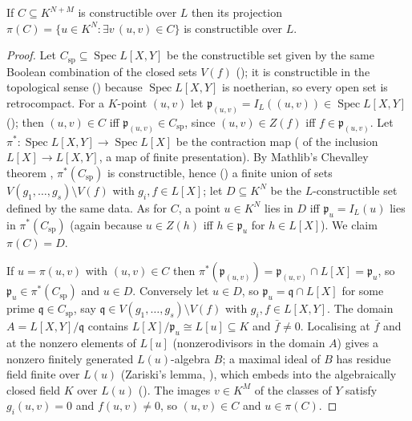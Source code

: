 \begin{theorem}\label{thm:chevalley}
If $C\subseteq K^{N+M}$ is constructible over $L$ then its projection
$\pi(C)=\{u\in K^N:\exists v\,(u,v)\in C\}$ is constructible over $L$.
\end{theorem}
\begin{proof}
Let $C_{\mathrm{sp}}\subseteq\operatorname{Spec}L[X,Y]$ be the constructible set given by
the same Boolean combination of the closed sets $V(f)$ ();
it is constructible in the topological sense () because
$\operatorname{Spec}L[X,Y]$ is noetherian, so every open set is retrocompact.
For a $K$-point $(u,v)$ let $\mathfrak p_{(u,v)}=I_L((u,v))\in\operatorname{Spec}L[X,Y]$
(); then $(u,v)\in C$ iff $\mathfrak p_{(u,v)}\in C_{\mathrm{sp}}$,
since $(u,v)\in Z(f)$ iff $f\in\mathfrak p_{(u,v)}$.  Let
$\pi^*:\operatorname{Spec}L[X,Y]\to\operatorname{Spec}L[X]$ be the contraction map
( of the inclusion $L[X]\to L[X,Y]$, a map of finite
presentation).  By Mathlib's Chevalley theorem
, $\pi^*(C_{\mathrm{sp}})$ is
constructible, hence () a finite
union of sets $V(g_1,\dots,g_s)\setminus V(f)$ with $g_i,f\in L[X]$; let $D\subseteq K^N$
be the $L$-constructible set defined by the same data.  As for $C$, a point $u\in K^N$
lies in $D$ iff $\mathfrak p_u=I_L(u)$ lies in $\pi^*(C_{\mathrm{sp}})$ (again because
$u\in Z(h)$ iff $h\in\mathfrak p_u$ for $h\in L[X]$).  We claim $\pi(C)=D$.

If $u=\pi(u,v)$ with $(u,v)\in C$ then $\pi^*(\mathfrak p_{(u,v)})=\mathfrak p_{(u,v)}\cap L[X]
=\mathfrak p_u$, so $\mathfrak p_u\in\pi^*(C_{\mathrm{sp}})$ and $u\in D$.  Conversely let
$u\in D$, so $\mathfrak p_u=\mathfrak q\cap L[X]$ for some prime $\mathfrak q\in C_{\mathrm{sp}}$,
say $\mathfrak q\in V(g_1,\dots,g_s)\setminus V(f)$ with $g_i,f\in L[X,Y]$.  The domain
$A=L[X,Y]/\mathfrak q$ contains $L[X]/\mathfrak p_u\cong L[u]\subseteq K$ and $\bar f\ne0$.
Localising at $\bar f$ and at the nonzero elements of $L[u]$ (nonzerodivisors in the
domain $A$) gives a nonzero finitely generated $L(u)$-algebra $B$; a maximal ideal of
$B$ has residue field finite over $L(u)$ (Zariski's lemma,
), which embeds into
the algebraically closed field $K$ over $L(u)$ ().  The images
$v\in K^M$ of the classes of $Y$ satisfy $g_i(u,v)=0$ and $f(u,v)\ne0$, so $(u,v)\in C$
and $u\in\pi(C)$.
\end{proof}

